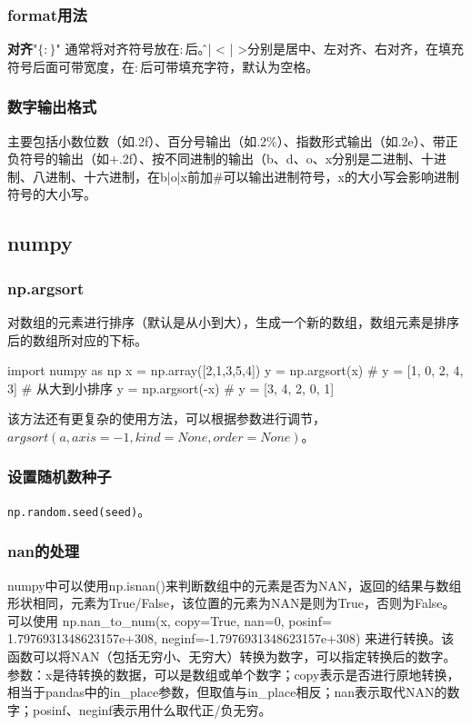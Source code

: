 \subsubsection{format用法}
\textbf{对齐}"$\{:\}$" 通常将对齐符号放在$:$后。\^ 、| < | >分别是居中、左对齐、右对齐，在填充符号后面可带宽度，在$:$后可带填充字符，默认为空格。

\subsubsection{数字输出格式}主要包括小数位数（如.2f）、百分号输出（如.2\%）、指数形式输出（如.2e）、带正负符号的输出（如+.2f）、按不同进制的输出（b、d、o、x分别是二进制、十进制、八进制、十六进制，在b|o|x前加\#可以输出进制符号，x的大小写会影响进制符号的大小写。


\subsection{numpy}
\subsubsection{np.argsort} 对数组的元素进行排序（默认是从小到大），生成一个新的数组，数组元素是排序后的数组所对应的下标。
\begin{python}
	import numpy as np
	x = np.array([2,1,3,5,4])
	y = np.argsort(x) # y = [1, 0, 2, 4, 3]
	# 从大到小排序
	y = np.argsort(-x) # y = [3, 4, 2, 0, 1]
\end{python}
该方法还有更复杂的使用方法，可以根据参数进行调节，$argsort(a, axis=-1, kind=None, order=None)$。

\subsubsection{设置随机数种子}
\texttt{np.random.seed(seed)}。





\subsubsection{nan的处理}numpy中可以使用np.isnan()来判断数组中的元素是否为NAN，返回的结果与数组形状相同，元素为True/False，该位置的元素为NAN是则为True，否则为False。可以使用 np.nan\_to\_num(x, copy=True, nan=0, posinf= 1.7976931348623157e+308, neginf=-1.7976931348623157e+308) 来进行转换。该函数可以将NAN（包括无穷小、无穷大）转换为数字，可以指定转换后的数字。参数：x是待转换的数据，可以是数组或单个数字；copy表示是否进行原地转换，相当于pandas中的in\_place参数，但取值与in\_place相反；nan表示取代NAN的数字；posinf、neginf表示用什么取代正/负无穷。

